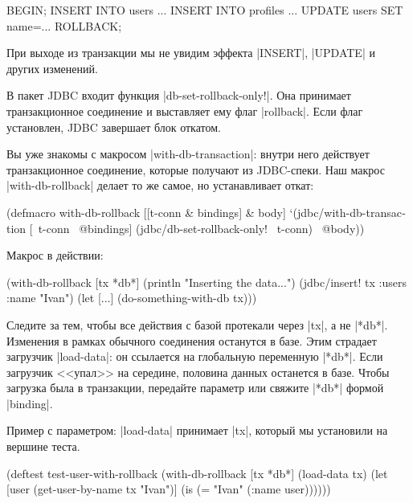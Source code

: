 \begin{english}
  \begin{sql}
BEGIN;
INSERT INTO users ...
INSERT INTO profiles ...
UPDATE users SET name=...
ROLLBACK;
  \end{sql}
\end{english}

При выходе из транзакции мы не увидим эффекта \spverb|INSERT|, \spverb|UPDATE| и
других изменений.

В пакет JDBC входит функция \spverb|db-set-rollback-only!|. Она принимает
транзакционное соединение и выставляет ему флаг \spverb|rollback|. Если флаг
установлен, JDBC завершает блок откатом.

Вы уже знакомы с макросом \spverb|with-db-transaction|: внутри него действует
транзакционное соединение, которые получают из JDBC-спеки. Наш макрос
\spverb|with-db-rollback| делает то же самое, но устанавливает откат:

\begin{english}
  \begin{clojure}
(defmacro with-db-rollback
  [[t-conn & bindings] & body]
  `(jdbc/with-db-transaction [~t-conn ~@bindings]
     (jdbc/db-set-rollback-only! ~t-conn)
     ~@body))
  \end{clojure}
\end{english}

Макрос в действии:

\begin{english}
  \begin{clojure}
(with-db-rollback [tx *db*]
  (println "Inserting the data...")
  (jdbc/insert! tx :users {:name "Ivan"})
  (let [...]
    (do-something-with-db tx)))
  \end{clojure}
\end{english}

Следите за тем, чтобы все действия с базой протекали через \spverb|tx|, а не
\spverb|*db*|. Изменения в рамках обычного соединения останутся в базе. Этим
страдает загрузчик \spverb|load-data|: он ссылается на глобальную переменную
\spverb|*db*|. Если загрузчик <<упал>> на середине, половина данных останется в
базе. Чтобы загрузка была в транзакции, передайте параметр или свяжите
\spverb|*db*| формой \spverb|binding|.

Пример с параметром: \spverb|load-data| принимает \spverb|tx|, который мы
установили на вершине теста.

\begin{english}
  \begin{clojure}
(deftest test-user-with-rollback
  (with-db-rollback [tx *db*]
    (load-data tx)
    (let [user (get-user-by-name tx "Ivan")]
      (is (= "Ivan" (:name user))))))
  \end{clojure}
\end{english}

